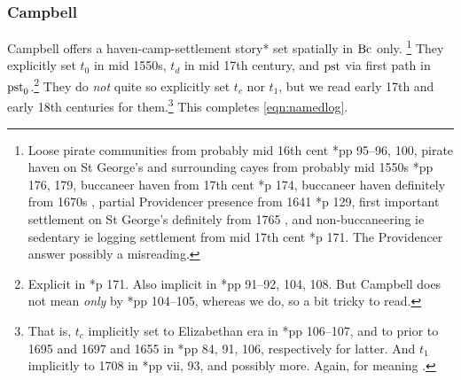 		\subsubsection{Campbell}
		\label{sss:campbell}
		Campbell offers a haven-camp-settlement story* set spatially in \(\operatorname{Bc}\) only.%
		\footnote{Loose pirate communities from probably mid 16th cent \cite{cam11}*{pp 95--96, 100}, pirate haven on St George's and surrounding cayes from probably mid 1550s \cite{cam03}*{pp 176, 179}, buccaneer haven from 17th cent \cite{cam03}*{p 174}, buccaneer haven definitely from 1670s , partial Providencer presence from 1641 \cite{cam11}*{p 129}, first important settlement on St George's definitely from 1765 , and non-buccaneering ie sedentary ie logging settlement from mid 17th cent \cite{cam03}*{p 171}. The Providencer answer possibly a misreading.}
		They explicitly set \(t_0\) in mid 1550s, \(t_d\) in mid 17th century, and \(\operatorname{pst}\) via first path in \(\operatorname{pst}_0\).\footnote{Explicit in \cite{cam03}*{p 171}. Also implicit in \cite{cam11}*{pp 91--92, 104, 108}. But Campbell does not mean \emph{only}  by  \cite{cam11}*{pp 104--105}, whereas we do, so a bit tricky to read.} %
		They do \emph{not} quite so explicitly set \(t_c\) nor \(t_1\), but we read early 17th and early 18th centuries for them.\footnote{That is, \(t_c\) implicitly set to Elizabethan era in \cite{cam11}*{pp 106--107}, and to prior to 1695 and 1697 and 1655 in \cite{cam11}*{pp 84, 91, 106}, respectively for latter. And \(t_1\) implicitly to 1708 in \cite{cam11}*{pp vii, 93}, and possibly more. Again, for  meaning .} This completes \ref{eqn:namedlog}.
